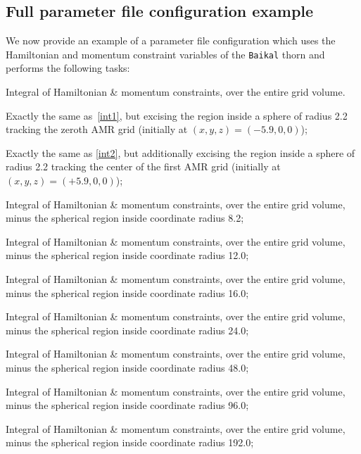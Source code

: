 \subsection{Full parameter file configuration example}
\label{sec:full_parfileexample}

We now provide an example of a parameter file configuration which uses
the Hamiltonian and momentum constraint variables of the \texttt{Baikal}
thorn and performs the following tasks:
\begin{packed_enumerate}
\item Integral of Hamiltonian \& momentum constraints, over the entire
  grid volume.
  \label{int1}
\item Exactly the same as~\ref{int1}, but excising the region inside a
  sphere of radius 2.2 tracking the zeroth AMR grid (initially at
  $(x,y,z) = (-5.9,0,0)$);
  \label{int2}
\item Exactly the same as \ref{int2}, but additionally excising the
  region inside a sphere of radius 2.2 tracking the center of the first
  AMR grid (initially at $(x,y,z)=(+5.9,0,0)$);
  \label{int3}
\item Integral of Hamiltonian \& momentum constraints, over the entire
  grid volume, minus the spherical region inside coordinate radius 8.2;
  \label{int4}
\item Integral of Hamiltonian \& momentum constraints, over the entire
  grid volume, minus the spherical region inside coordinate radius 12.0;
  \label{int5}
\item Integral of Hamiltonian \& momentum constraints, over the entire
  grid volume, minus the spherical region inside coordinate radius 16.0;
  \label{int6}
\item Integral of Hamiltonian \& momentum constraints, over the entire
  grid volume, minus the spherical region inside coordinate radius 24.0;
  \label{int7}
\item Integral of Hamiltonian \& momentum constraints, over the entire
  grid volume, minus the spherical region inside coordinate radius 48.0;
  \label{int8}
\item Integral of Hamiltonian \& momentum constraints, over the entire
  grid volume, minus the spherical region inside coordinate radius 96.0;
  \label{int9}
\item Integral of Hamiltonian \& momentum constraints, over the entire
  grid volume, minus the spherical region inside coordinate radius 192.0;
  \label{int10}
\end{packed_enumerate}
